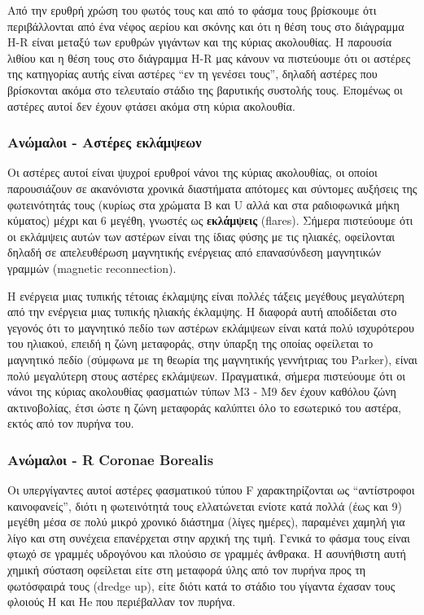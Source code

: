 Από την ερυθρή χρώση του φωτός τους και από το φάσμα τους βρίσκουμε ότι περιβάλλονται από ένα νέφος αερίου και σκόνης και ότι η θέση τους στο διάγραμμα H-R είναι μεταξύ των ερυθρών γιγάντων και της κύριας ακολουθίας. Η παρουσία λιθίου και η θέση τους στο διάγραμμα H-R μας κάνουν να πιστεύουμε ότι οι αστέρες της κατηγορίας αυτής είναι αστέρες ``εν τη γενέσει τους'', δηλαδή αστέρες που βρίσκονται ακόμα στο τελευταίο στάδιο της βαρυτικής συστολής τους. Επομένως οι αστέρες αυτοί δεν έχουν φτάσει ακόμα στη κύρια ακολουθία.

\subsubsection{Ανώμαλοι - Αστέρες εκλάμψεων}
Οι αστέρες αυτοί είναι ψυχροί ερυθροί νάνοι της κύριας ακολουθίας, οι οποίοι παρουσιάζουν σε ακανόνιστα χρονικά διαστήματα απότομες και σύντομες αυξήσεις της φωτεινότητάς τους (κυρίως στα χρώματα B και U αλλά και στα ραδιοφωνικά μήκη κύματος) μέχρι και 6 μεγέθη, γνωστές ως \textbf{εκλάμψεις} (flares). Σήμερα πιστεύουμε ότι οι εκλάμψεις αυτών των αστέρων είναι της ίδιας φύσης με τις ηλιακές, οφείλονται δηλαδή σε απελευθέρωση μαγνητικής ενέργειας από επανασύνδεση μαγνητικών γραμμών (magnetic reconnection).

Η ενέργεια μιας τυπικής τέτοιας έκλαμψης είναι πολλές τάξεις μεγέθους μεγαλύτερη από την ενέργεια μιας τυπικής ηλιακής έκλαμψης. Η διαφορά αυτή αποδίδεται στο γεγονός ότι το μαγνητικό πεδίο των αστέρων εκλάμψεων είναι κατά πολύ ισχυρότερου του ηλιακού, επειδή η ζώνη μεταφοράς, στην ύπαρξη της οποίας οφείλεται το μαγνητικό πεδίο (σύμφωνα με τη θεωρία της μαγνητικής γεννήτριας του Parker), είναι πολύ μεγαλύτερη στους αστέρες εκλάμψεων. Πραγματικά, σήμερα πιστεύουμε ότι οι νάνοι της κύριας ακολουθίας φασματιών τύπων Μ3 - Μ9 δεν έχουν καθόλου ζώνη ακτινοβολίας, έτσι ώστε η ζώνη μεταφοράς καλύπτει όλο το εσωτερικό του αστέρα, εκτός από τον πυρήνα του.

\subsubsection{Ανώμαλοι - R Coronae Borealis}
Οι υπεργίγαντες αυτοί αστέρες φασματικού τύπου F χαρακτηρίζονται ως ``αντίστροφοι καινοφανείς'', διότι η φωτεινότητά τους ελλατώνεται ενίοτε κατά πολλά (έως και 9) μεγέθη μέσα σε πολύ μικρό χρονικό διάστημα (λίγες ημέρες), παραμένει χαμηλή για λίγο και στη συνέχεια επανέρχεται στην αρχική της τιμή. Γενικά το φάσμα τους είναι φτωχό σε γραμμές υδρογόνου και πλούσιο σε γραμμές άνθρακα. Η ασυνήθιστη αυτή χημική σύσταση οφείλεται είτε στη μεταφορά ύλης από τον πυρήνα προς τη φωτόσφαιρά τους (dredge up), είτε διότι κατά το στάδιο του γίγαντα έχασαν τους φλοιούς H και He που περιέβαλλαν τον πυρήνα.

